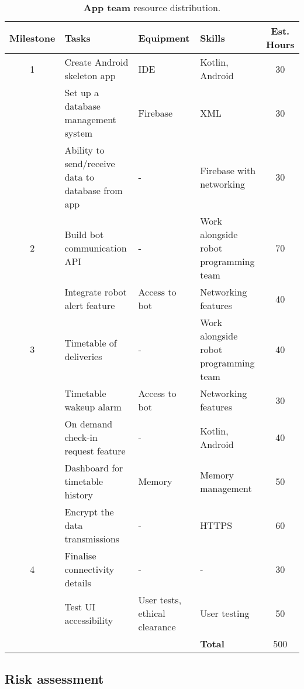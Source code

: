 \documentclass{article}
\begin{document}
\begin{table*}[]
  \begin{center}
  \begin{small}
  \begin{tabular}{|c|l|l|l|c|}
    \hline
    {\bf Milestone} & {\bf Tasks} & {\bf Equipment} & {\bf Skills} & {\bf Est. Hours} \\ \hline
    1               & Create Android skeleton app & IDE & Kotlin, Android & 30\\ \cline{2-5}
                    & Set up a database management system & Firebase & XML & 30\\ \cline{2-5}
                    & Ability to send/receive data to database from app & - & Firebase with networking & 30\\ \hline
    2               & Build bot communication API & - & Work alongside robot programming team & 70\\ \cline{2-5}
                    & Integrate robot alert feature & Access to bot & Networking features & 40\\ \hline
    3               & Timetable of deliveries & - & Work alongside robot programming team & 40\\ \cline{2-5}
                    & Timetable wakeup alarm & Access to bot & Networking features & 30\\ \cline{2-5}
                    & On demand check-in request feature & - & Kotlin, Android & 40\\ \cline{2-5}
                    & Dashboard for timetable history & Memory & Memory management & 50\\ \cline{2-5}
                    & Encrypt the data transmissions & - & HTTPS & 60\\ \hline
    4               & Finalise connectivity details & - & - & 30\\ \cline{2-5}
                    & Test UI accessibility & User tests, ethical clearance & User testing & 50\\ \hline
                    &                           &  & {\bf Total} & 500 \\ \hline
  \end{tabular}
  \end{small}
  \caption{{\bf App team} resource distribution.}
  \label{tab:app-rd}
  \end{center}
\end{table*}


\subsection{Risk assessment} 
\end{document}

